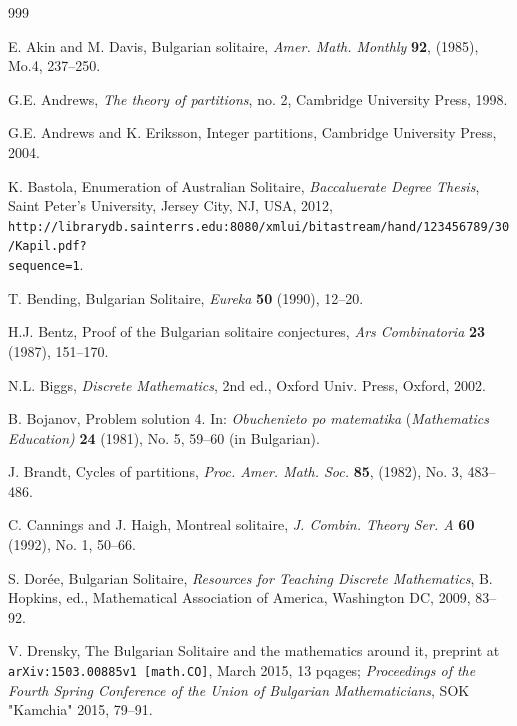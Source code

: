 \documentclass[oneside,12pt]{amsart}
\theoremstyle{definition}
\numberwithin{equation}{section}
\begin{document}
\begin{thebibliography}{999} 

  E. Akin and M. Davis,  Bulgarian solitaire,  {\it Amer. Math.
 Monthly}  {\bf 92},   (1985), Mo.4, 237--250.

  G.E. Andrews, {\it The theory of partitions}, 
no. 2, Cambridge University Press, 1998.


  G.E. Andrews and K. Eriksson, {Integer partitions}, 
Cambridge University Press, 2004.


 K. Bastola, Enumeration of Australian Solitaire, 
{\it Baccaluerate Degree Thesis}, Saint Peter's University, 
Jersey City, NJ, USA, 2012, 
{\tt http://librarydb.sainterrs.edu:8080/xmlui/bitastream/hand/123456789/30/Kapil.pdf?\\sequence=1}. 


 T. Bending, Bulgarian Solitaire, {\it Eureka} {\bf 50} (1990),
12--20. 


 H.J. Bentz, Proof of the Bulgarian solitaire conjectures,
{\it Ars Combinatoria} {\bf 23} (1987), 151--170.

 N.L. Biggs, {\it Discrete Mathematics}, 2nd ed., 
Oxford Univ. Press, Oxford, 2002.



 B. Bojanov, Problem solution 4. In:  {\it Obuchenieto po 
matematika}  ({\it Mathematics Education)}  {\bf 24} (1981), 
No. 5, 59--60 (in Bulgarian).


  J. Brandt, Cycles of partitions, {\it Proc. Amer. Math. Soc.}
 {\bf 85}, (1982), No. 3,  483--486.



 C. Cannings and J. Haigh, Montreal solitaire, {\it J. Combin. 
Theory Ser. A} {\bf 60} (1992), No. 1, 50--66.

 S. Dor\'{e}e, Bulgarian Solitaire, {\it Resources for 
Teaching Discrete Mathematics}, B. Hopkins, ed., Mathematical 
Association of America, Washington DC, 2009, 83--92. 

 V. Drensky, The Bulgarian Solitaire and the 
mathematics around it, preprint at {\tt arXiv:1503.00885v1 [math.CO]}, March 2015,
13 pqages; {\it Proceedings of the Fourth Spring Conference of 
the Union of Bulgarian Mathematicians}, SOK "Kamchia"
2015, 79--91.   


\end{thebibliography}
\end{document}
